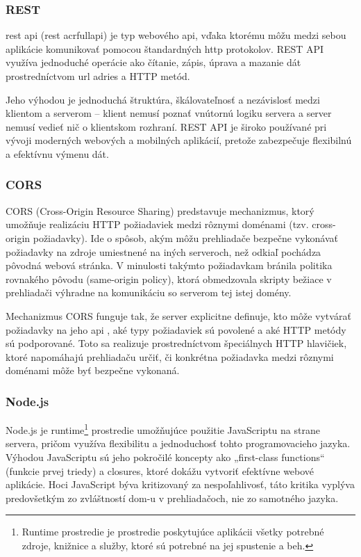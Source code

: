  \subsubsection{REST}
 \acrshort{rest} \acrshort{api} (\acrfull{rest} acrfull{api}) je typ webového \acrshort{api}, vďaka ktorému môžu medzi sebou aplikácie komunikovať pomocou štandardných \acrshort{http} protokolov. 
 REST API využíva jednoduché operácie ako čítanie, zápis, úprava a mazanie dát prostredníctvom \acrshort{url} adries a HTTP metód.

Jeho výhodou je jednoduchá štruktúra, škálovateľnosť a nezávislosť medzi klientom a serverom – klient nemusí poznať vnútornú logiku servera a server nemusí vedieť nič o klientskom rozhraní.
 REST API je široko používané pri vývoji moderných webových a mobilných aplikácií, pretože zabezpečuje flexibilnú a efektívnu výmenu dát.
\subsubsection{CORS}
CORS (Cross-Origin Resource Sharing) predstavuje mechanizmus, ktorý umožňuje realizáciu HTTP požiadaviek medzi rôznymi doménami (tzv. cross-origin požiadavky).
 Ide o spôsob, akým môžu prehliadače bezpečne vykonávať požiadavky na zdroje umiestnené na iných serveroch, než odkiaľ pochádza pôvodná webová stránka. 
 V minulosti takýmto požiadavkam bránila politika rovnakého pôvodu (same-origin policy), ktorá obmedzovala skripty bežiace v prehliadači výhradne na komunikáciu so serverom tej istej domény.

Mechanizmus CORS funguje tak, že server explicitne definuje, kto môže vytvárať požiadavky na jeho \acrshort{api}
, aké typy požiadaviek sú povolené a aké HTTP metódy sú podporované.
 Toto sa realizuje prostredníctvom špeciálnych HTTP hlavičiek, ktoré napomáhajú prehliadaču určiť, či konkrétna požiadavka medzi rôznymi doménami môže byť bezpečne vykonaná.\cite{CORS}\cite{aipreklad}
\subsubsection{Node.js}
Node.js je runtime\footnote{Runtime prostredie je prostredie poskytujúce aplikácii všetky potrebné zdroje, knižnice a služby, ktoré sú potrebné na jej spustenie a beh.}
prostredie umožňujúce použitie JavaScriptu na strane servera, pričom využíva flexibilitu a jednoduchosť tohto programovacieho jazyka.
 Výhodou JavaScriptu sú jeho pokročilé koncepty ako „first-class functions“ (funkcie prvej triedy) a closures, ktoré dokážu vytvoriť efektívne webové aplikácie. 
 Hoci JavaScript býva kritizovaný za nespoľahlivosť, táto kritika vyplýva predovšetkým zo zvláštností \acrshort{dom}-u v prehliadačoch, nie zo samotného jazyka.
